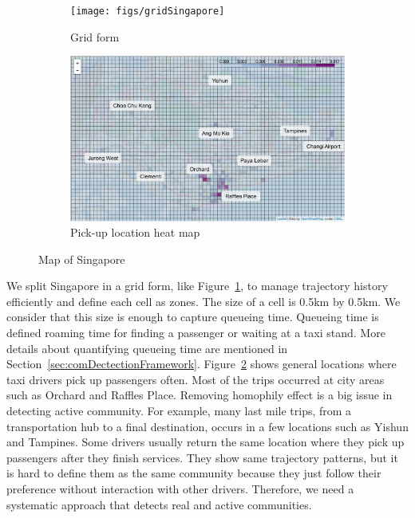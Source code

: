 \documentclass{article}
\begin{document}
\begin{figure} [h] 

\centering
\begin{subfigure}{\linewidth}
  \centering
  \texttt{[image: figs/gridSingapore]}
  \caption{Grid form}
  \label{fig:gridSingapore}
\end{subfigure}

\begin{subfigure}{\linewidth}
  \centering
  \includegraphics[width=0.95\linewidth]{figs/locationHeatMap}
  \caption{Pick-up location heat map}
  \label{fig:locationHeatMap}
\end{subfigure}

\caption{Map of Singapore}
\label{fig:mapSingapore}
\end{figure}


We split Singapore in a grid form, like Figure~\ref{fig:gridSingapore}, to manage trajectory history efficiently and define each cell as zones. The size of a cell is 0.5km by 0.5km. We consider that this size is enough to capture queueing time. Queueing time is defined roaming time for finding a passenger or waiting at a taxi stand. More details about quantifying queueing time are mentioned in Section~\ref{sec:comDectectionFramework}. Figure~\ref{fig:locationHeatMap} shows general locations where taxi drivers pick up passengers often. Most of the trips occurred at city areas such as Orchard and Raffles Place. Removing homophily effect is a big issue in detecting active community. For example, many last mile trips, from a transportation hub to a final destination, occurs in a few locations such as Yishun and Tampines. Some drivers usually return the same location where they pick up passengers after they finish services. They show same trajectory patterns, but it is hard to define them as the same community because they just follow their preference without interaction with other drivers. Therefore, we need a systematic approach that detects real and active communities.
\end{document}
